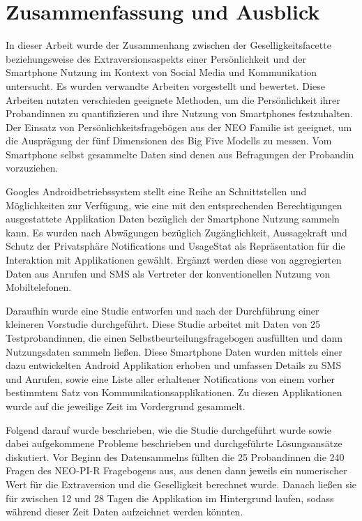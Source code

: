 
\chapter{Zusammenfassung und Ausblick}
\label{ch:Zusammenfassung}


In dieser Arbeit wurde der Zusammenhang zwischen der Geselligkeitsfacette beziehungsweise des Extraversionsaspekts
einer Persönlichkeit und der Smartphone Nutzung im Kontext von Social Media und Kommunikation untersucht.
Es wurden verwandte Arbeiten vorgestellt und bewertet. 
Diese Arbeiten nutzten verschieden geeignete Methoden, um die Persönlichkeit ihrer Probandinnen zu quantifizieren und ihre Nutzung von Smartphones festzuhalten.
Der Einsatz von Persönlichkeitsfragebögen aus der NEO Familie ist geeignet, um die Ausprägung der fünf Dimensionen des Big Five Modells zu messen.
Vom Smartphone selbst gesammelte Daten sind denen aus Befragungen der Probandin vorzuziehen.
\par
Googles Androidbetriebssystem stellt eine Reihe an Schnittstellen und Möglichkeiten zur Verfügung, wie eine mit den entsprechenden Berechtigungen ausgestattete Applikation
Daten bezüglich der Smartphone Nutzung sammeln kann.
Es wurden nach Abwägungen bezüglich Zugänglichkeit, Aussagekraft und Schutz der Privatsphäre Notifications und UsageStat als Repräsentation für die Interaktion mit Applikationen gewählt.
Ergänzt werden diese von aggregierten Daten aus Anrufen und SMS als Vertreter der konventionellen Nutzung von Mobiltelefonen.
\par
Daraufhin wurde eine Studie entworfen und nach der Durchführung einer kleineren Vorstudie durchgeführt.
Diese Studie arbeitet mit Daten von 25 Testprobandinnen, die einen Selbstbeurteilungsfragebogen ausfüllten und dann Nutzungsdaten sammeln ließen.
Diese Smartphone Daten wurden mittels einer dazu entwickelten Android Applikation erhoben und umfassen Details zu SMS und Anrufen, sowie eine Liste aller erhaltener Notifications von einem vorher bestimmtem Satz von Kommunikationsapplikationen.
Zu diesen Applikationen wurde auf die jeweilige Zeit im Vordergrund gesammelt.

Folgend darauf wurde beschrieben, wie die Studie durchgeführt wurde sowie dabei aufgekommene Probleme beschrieben und durchgeführte Lösungsansätze diskutiert.
Vor Beginn des Datensammelns füllten die 25 Probandinnen die 240 Fragen des NEO-PI-R Fragebogens aus, aus denen dann jeweils ein numerischer Wert für die Extraversion und die Geselligkeit berechnet wurde.
Danach ließen sie für zwischen 12 und 28 Tagen die Applikation im Hintergrund laufen, sodass während dieser Zeit Daten aufzeichnet werden könnten.

